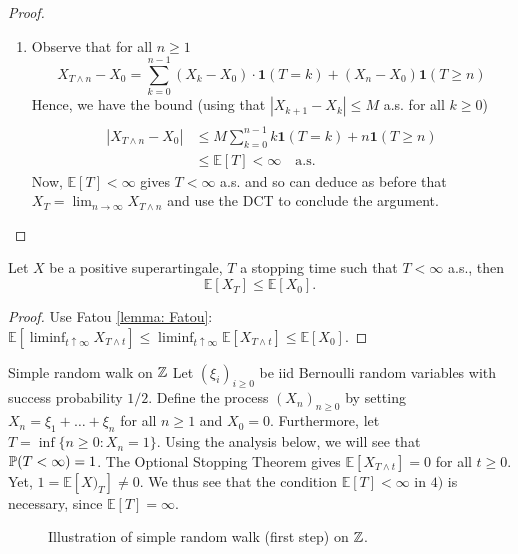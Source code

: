 \documentclass{article}
\begin{document}
\begin{proof}
\begin{enumerate}
\item Observe that for all $ n\geq 1$
	\[
	X_{T\land n}-X_{0} =\displaystyle\sum^{n-1}_{k=0}(X_{k}-X_{0})\cdot \mathbf{1}(T=k)+(X_{n} -X_{0})\mathbf{1}(T\geq n) 
	\]
Hence, we have the bound (using that $ |X_{k+1}-X_{k}|\leq M$ a.s. for all $ k\geq 0$)
\[
\begin{array}{ll}
    \\
|X_{T\land n}-X_{0}|&\leq M\displaystyle\sum^{n-1}_{k=0} k\mathbf{1}(T=k) + n\mathbf{1}(T\geq n)\\
			&\leq\mathbb{E}[T]<\infty \quad \text{a.s.}
\end{array}
\]
Now, $\mathbb{E}[T]<\infty$ gives $ T<\infty$ a.s. and so can deduce as before that $ X_{T} = \displaystyle \lim_{n\to \infty} X_{T\land n} $ and use the DCT to conclude the argument. 


 \end{enumerate}
    
\end{proof}


\begin{boxcor}\label{cor: pos supermg bound}
Let $ X$ be a positive superartingale, $ T$ a stopping time such that $ T<\infty$ a.s., then 
\[
	\mathbb{E}[X_{T}]\leq\mathbb{E}[X_{0}].
\]

\end{boxcor}

\begin{proof}
	Use Fatou \ref{lemma: Fatou}: $\mathbb{E}[\displaystyle\liminf_{t\uparrow \infty}X_{T\land t}]\leq \displaystyle\liminf_{t\uparrow \infty}\mathbb{E}[X_{T\land t}]\leq\mathbb{E}[X_{0}]$.
\end{proof}


\begin{examplesblock}{Simple random walk on $ \mathbb{Z}$}\label{def: SRW on ints}
	Let $ (\xi_{i})_{i\geq 0}$ be iid Bernoulli random variables with success probability $ 1/2$. Define the process $(X_{n})_{n\geq 0}$ by setting $ X_{n} = \xi_{1}+\dots+\xi_{n}$ for all $ n\geq 1$ and $ X_{0}=0$. Furthermore, let $ T = \inf\{n\geq 0: X_{n}= 1\}$. Using the analysis below, we will see that $ \mathbb{P}(T<\infty)=1$. The Optional Stopping Theorem gives $\mathbb{E}[X_{T\land t}]=0$ for all $ t\geq 0$. Yet, $1 = \mathbb{E}[X)_{T}]\neq 0$. We thus see that the condition $\mathbb{E}[T]<\infty$ in $ 4)$ is necessary, since $\mathbb{E}[T] = \infty$. 
	\begin{figure}[H]
	    \centering
	    
	    \caption{Illustration of simple random walk (first step) on $ \mathbb{Z}$.}
	    \label{fig: SRW on Z}
	\end{figure}
\end{examplesblock}
\end{document}
